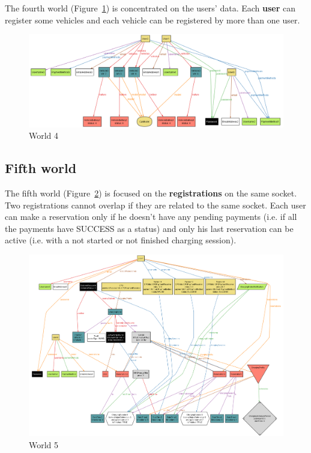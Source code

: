 \documentclass{Configuration_Files/PoliMi3i_thesis}
\begin{document}
The fourth world (Figure~\ref{fig:world4}) is concentrated on the users' data. Each \textbf{user} can register some vehicles and each vehicle can be registered by more than one user.

\begin{figure}[H]
    \centering
    \includegraphics[width=1\textwidth]{Images/alloy/world4.png}
    \caption{World 4}
    \label{fig:world4}
\end{figure}

\subsection{Fifth world}

The fifth world (Figure~\ref{fig:world5}) is focused on the \textbf{registrations} on the same socket. Two registrations cannot overlap if they are related to the same socket. Each user can make a reservation only if he doesn't have any pending payments (i.e. if all the payments have SUCCESS as a status) and only his last reservation can be active (i.e. with a not started or not finished charging session).

\begin{figure}[H]
    \centering
    \includegraphics[width=1\textwidth]{Images/alloy/world5.png}
    \caption{World 5}
    \label{fig:world5}
\end{figure}
\end{document}
